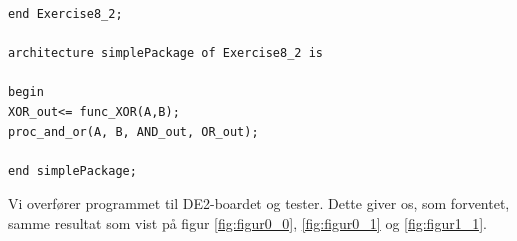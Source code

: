 \begin{enumerate}
\begin{lstlisting}[caption={Kode for test af package},label={lst:opg1_2test}]
end Exercise8_2;

architecture simplePackage of Exercise8_2 is

begin 
XOR_out<= func_XOR(A,B);
proc_and_or(A, B, AND_out, OR_out);

end simplePackage;

\end{lstlisting}

Vi overfører programmet til DE2-boardet og tester. Dette giver os, som forventet, samme resultat som vist på figur \ref{fig:figur0_0}, \ref{fig:figur0_1} og \ref{fig:figur1_1}.

\end{enumerate}